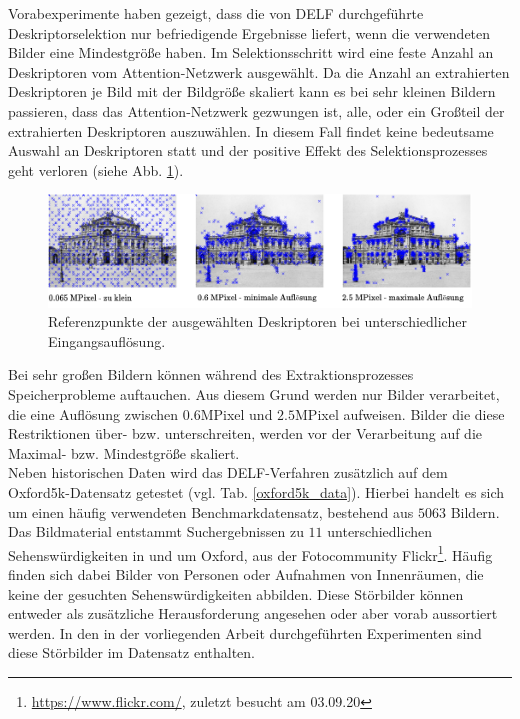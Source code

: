 Vorabexperimente haben gezeigt, dass die von DELF durchgeführte Deskriptorselektion nur befriedigende Ergebnisse liefert, wenn die verwendeten Bilder eine Mindestgröße haben. Im Selektionsschritt wird eine feste Anzahl an Deskriptoren vom Attention-Netzwerk ausgewählt. Da die Anzahl an extrahierten Deskriptoren je Bild mit der Bildgröße skaliert kann es bei sehr kleinen Bildern passieren, dass das Attention-Netzwerk gezwungen ist, alle, oder ein Großteil der extrahierten Deskriptoren auszuwählen. In diesem Fall findet keine bedeutsame Auswahl an Deskriptoren statt und der positive Effekt des Selektionsprozesses geht verloren (siehe Abb. \ref{small_img}).
\begin{figure}[h]
\includegraphics[scale=0.955]{scale_descriptor_selection.pdf}
\caption{Referenzpunkte der ausgewählten Deskriptoren bei unterschiedlicher Eingangsauflösung.}
\label{small_img}
\end{figure}
Bei sehr großen Bildern können während des Extraktionsprozesses Speicherprobleme auftauchen. Aus diesem Grund werden nur Bilder verarbeitet, die eine Auflösung zwischen $0.6$MPixel und $2.5$MPixel aufweisen. Bilder die diese Restriktionen über- bzw. unterschreiten, werden vor der Verarbeitung auf die Maximal- bzw. Mindestgröße skaliert.\\
Neben historischen Daten wird das DELF-Verfahren zusätzlich auf dem Oxford5k-Datensatz \cite{oxford5k} getestet (vgl. Tab. \ref{oxford5k_data}). Hierbei handelt es sich um einen häufig verwendeten Benchmarkdatensatz, bestehend aus $5063$ Bildern. Das Bildmaterial entstammt Suchergebnissen zu $11$ unterschiedlichen Sehenswürdigkeiten in und um Oxford, aus der Fotocommunity Flickr\footnote{\url{https://www.flickr.com/}, zuletzt besucht am 03.09.20}. Häufig finden sich dabei Bilder von Personen oder Aufnahmen von Innenräumen, die keine der gesuchten Sehenswürdigkeiten abbilden. Diese Störbilder können entweder als zusätzliche Herausforderung angesehen oder aber vorab aussortiert werden. In den in der vorliegenden Arbeit durchgeführten Experimenten sind diese Störbilder im Datensatz enthalten. 
